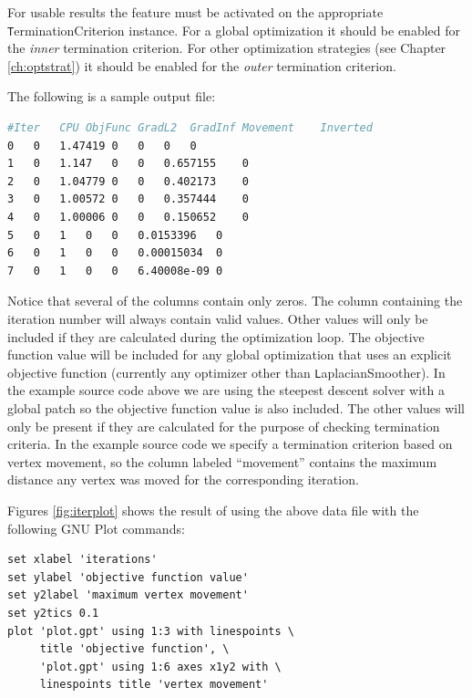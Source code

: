 For usable results the feature must be activated on the appropriate {\texttt TerminationCriterion} instance.  For a global optimization it should be enabled for the {\em inner} termination criterion.  For other optimization strategies (see Chapter \ref{ch:optstrat}) it should be enabled for the {\em outer} termination criterion.  

The following is a sample output file:

\begin{lstlisting}[basicstyle=\small,language=make]
#Iter	CPU	ObjFunc	GradL2	GradInf	Movement	Inverted
0	0	1.47419	0	0	0	0
1	0	1.147	0	0	0.657155	0
2	0	1.04779	0	0	0.402173	0
3	0	1.00572	0	0	0.357444	0
4	0	1.00006	0	0	0.150652	0
5	0	1	0	0	0.0153396	0
6	0	1	0	0	0.00015034	0
7	0	1	0	0	6.40008e-09	0
\end{lstlisting}

Notice that several of the columns contain only zeros.  The column containing the iteration number will always contain valid values.  Other values will only be included if they are calculated during the optimization loop.  The objective function value will be included for any global optimization that uses an explicit objective function (currently any optimizer other than {\texttt LaplacianSmoother}).  In the example source code above we are using the steepest descent solver with a global patch so the objective function value is also included.  The other values will only be present if they are calculated for the purpose of checking termination criteria.  In the example source code we specify a termination criterion based on vertex movement, so the column labeled ``movement'' contains the maximum distance any vertex was moved for the corresponding iteration.  

Figures \ref{fig:iterplot} shows the result of using the above data file with the following GNU Plot commands:
\begin{verbatim}
set xlabel 'iterations'
set ylabel 'objective function value'
set y2label 'maximum vertex movement'
set y2tics 0.1
plot 'plot.gpt' using 1:3 with linespoints \
     title 'objective function', \
     'plot.gpt' using 1:6 axes x1y2 with \
     linespoints title 'vertex movement'
\end{verbatim}

